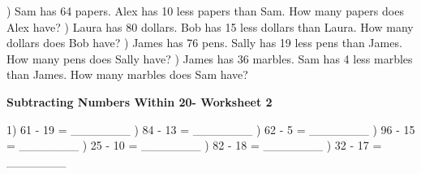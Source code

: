 \documentclass{article}%
\begin{document}
\newline%
\newline%
) Sam has 64 papers. Alex has 10 less papers than Sam. How many papers does Alex have?%
\newline%
\newline%
) Laura has 80 dollars. Bob has 15 less dollars than Laura. How many dollars does Bob have?%
\newline%
\newline%
) James has 76 pens. Sally has 19 less pens than James. How many pens does Sally have?%
\newline%
\newline%
) James has 36 marbles. Sam has 4 less marbles than James. How many marbles does Sam have?%
\newline%
\newline%
\newline%
\pagebreak%
\large%
\begin{center}%
\textbf{Subtracting Numbers Within 20- Worksheet 2}%
\newline%
\end{center} \normalsize%
1) 61 {-} 19 = \_\_\_\_\_\_\_%
\newline%
\newline%
) 84 {-} 13 = \_\_\_\_\_\_\_%
\newline%
\newline%
) 62 {-} 5 = \_\_\_\_\_\_\_%
\newline%
\newline%
) 96 {-} 15 = \_\_\_\_\_\_\_%
\newline%
\newline%
) 25 {-} 10 = \_\_\_\_\_\_\_%
\newline%
\newline%
) 82 {-} 18 = \_\_\_\_\_\_\_%
\newline%
\newline%
) 32 {-} 17 = \_\_\_\_\_\_\_%
\newline%
\newline%
\newline%
\end{document}
